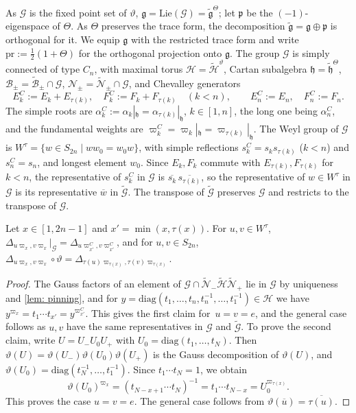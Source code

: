 \documentclass[a4paper]{amsart}
\numberwithin{equation}{section}
\theoremstyle{definition}
\theoremstyle{remark}
\newcommand{\mfh}{\mathfrak{h}}
\newcommand{\mfg}{\mathfrak{g}}
\newcommand{\mfp}{\mathfrak{p}}
\newcommand{\mcG}{\mathcal{G}}
\newcommand{\mcH}{\mathcal{H}}
\newcommand{\mcN}{\mathcal{N}}
\newcommand{\mcB}{\mathcal{B}}
\newcommand{\tG}{\widetilde{\mcG}}
\newcommand{\vt}{\vartheta}
\newcommand{\Vt}{\Theta}
\newcommand{\pr}{\mathrm{pr}}
\begin{document}
As $\mcG$ is the fixed point set of $\vt$, $\mfg=\mathrm{Lie}(\mcG)=\widetilde{\mfg}^\Vt$; let $\mfp$ be the $(-1)$-eigenspace of $\Vt$.
As $\Vt$ preserves the trace form, the decomposition $\widetilde{\mfg}=\mfg\oplus\mfp$ is orthogonal for it.
We equip $\mfg$ with the restricted trace form and write $\pr:=\frac12(1+\Vt)$ for the orthogonal projection onto $\mfg$.
The group $\mcG$ is simply connected of type $C_n$, with maximal torus $\mcH=\widetilde{\mcH}^\vt$, Cartan subalgebra $\mfh=\widetilde{\mfh}^\Vt$, $\mcB_\pm=\widetilde{\mcB}_\pm\cap\mcG$, $\mcN_\pm=\widetilde{\mcN}_\pm\cap\mcG$, and Chevalley generators
\[
  E^C_k:=E_k+E_{\tau(k)},\quad F^C_k:=F_k+F_{\tau(k)}\quad(k<n),
  \qquad
  E^C_n:=E_n,\quad F^C_n:=F_n.
\]
The simple roots are $\alpha^C_k:=\alpha_k|_\mfh=\alpha_{\tau(k)}|_\mfh$, $k\in[1,n]$, the long one being $\alpha^C_n$, and the fundamental weights are $\varpi^C_k=\varpi_k|_\mfh=\varpi_{\tau(k)}|_\mfh$.
The Weyl group of $\mcG$ is $W^\tau=\{w\in S_{2n}\mid ww_0=w_0w\}$, with simple reflections $s^C_k=s_ks_{\tau(k)}$ ($k<n$) and $s^C_n=s_n$, and longest element $w_0$.
Since $E_k,F_k$ commute with $E_{\tau(k)},F_{\tau(k)}$ for $k<n$, the representative of $s^C_k$ in $\mcG$ is $\overline{s_k}\,\overline{s_{\tau(k)}}$, so the representative of $w\in W^\tau$ in $\mcG$ is its representative $\overline{w}$ in $\tG$.
The transpose of $\tG$ preserves $\mcG$ and restricts to the transpose of $\mcG$.

\begin{lemma}
  \label{lem: minors restrict}
  Let $x\in[1,2n-1]$ and $x'=\min(x,\tau(x))$.
  For $u,v\in W^\tau$, $\Delta_{u\varpi_x,v\varpi_x}|_\mcG=\Delta_{u\varpi^C_{x'},v\varpi^C_{x'}}$, and for $u,v\in S_{2n}$, $\Delta_{u\varpi_x,v\varpi_x}\circ\vt=\Delta_{\tau(u)\varpi_{\tau(x)},\tau(v)\varpi_{\tau(x)}}$.
\end{lemma}
\begin{proof}
  The Gauss factors of an element of $\mcG\cap\widetilde{\mcN}_-\widetilde{\mcH}\widetilde{\mcN}_+$ lie in $\mcG$ by uniqueness and \cref{lem: pinning}, and for $y=\mathrm{diag}(t_1,\dots,t_n,t_n^{-1},\dots,t_1^{-1})\in\mcH$ we have $y^{\varpi_x}=t_1\cdots t_{x'}=y^{\varpi^C_{x'}}$.
  This gives the first claim for~$u=v=e$, and the general case follows as $u,v$ have the same representatives in $\mcG$ and $\tG$.
  To prove the second claim, write $U=U_-U_0U_+$ with $U_0=\mathrm{diag}(t_1,\dots,t_N)$.
  Then $\vt(U)=\vt(U_-)\vt(U_0)\vt(U_+)$ is the Gauss decomposition of $\vt(U)$, and $\vt(U_0)=\mathrm{diag}(t_N^{-1},\dots,t_1^{-1})$.
  Since $t_1\cdots t_N=1$, we obtain
  \[
    \vt(U_0)^{\varpi_x}=(t_{N-x+1}\cdots t_N)^{-1}=t_1\cdots t_{N-x}=U_0^{\varpi_{\tau(x)}}.
  \]
  This proves the case $u=v=e$.
  The general case follows from $\vt(\overline{u})=\overline{\tau(u)}$.
\end{proof}
\end{document}
